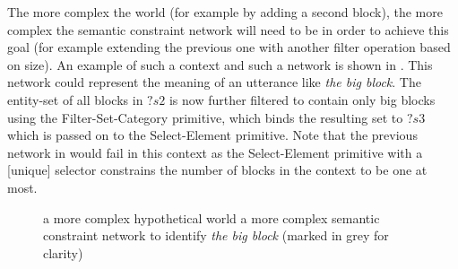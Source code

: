 \newpage The more complex the world (for example by adding a second block), the
more complex the semantic constraint network will need to be in order
to achieve this goal (for example extending the previous one with
another filter operation based on size). An example of such a context
and such a network is shown in . This network could represent
the meaning of an utterance like \textit{the big block}. The entity-set of
all blocks in $?s2$ is now further filtered to contain only big blocks
using the {\sc Filter-Set-Category} primitive, which binds the
resulting set to $?s3$ which is passed on to the {\sc Select-Element}
primitive. Note that the previous network in 
would fail in this context as the {\sc Select-Element} primitive with
a [unique] selector constrains the number of blocks in the context to
be one at most.

\begin{figure}[htbp]
\centering
{}
\caption[Example semantic constraint network for \textit{the big
block}]{ a more complex hypothetical
  world  a more complex semantic
  constraint network to identify \textit{the big block} (marked in grey for
  clarity)}
\label{f:more-complex-context-and-network}
\end{figure}

